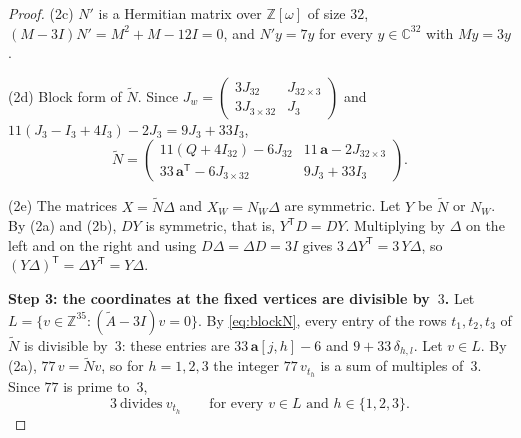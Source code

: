 \documentclass[11pt,a4paper]{article}
\theoremstyle{remark}
\newcommand{\ZZ}{\mathbb{Z}}
\newcommand{\CC}{\mathbb{C}}
\newcommand{\tp}{\mathsf{T}}
\newcommand{\av}{\mathbf{a}}
\newcommand{\tA}{\widetilde{A}}
\newcommand{\tN}{\widetilde{N}}
\newcommand{\Jw}{J_w}
\begin{document}
\begin{proof}
\smallskip\noindent(2c) $N'$ is a Hermitian matrix over $\ZZ[\omega]$ of size $32$, $(M-3I)N'=M^2+M-12I=0$, and
$N'y=7y$ for every $y\in\CC^{32}$ with $My=3y$.

\smallskip\noindent(2d) Block form of $\tN$. Since
$\Jw=\begin{pmatrix}3J_{32}&J_{32\times3}\\ 3J_{3\times32}&J_3\end{pmatrix}$ and
$11(J_3-I_3+4I_3)-2J_3=9J_3+33I_3$,
\begin{equation}\label{eq:blockN}
\tN=\begin{pmatrix}11(Q+4I_{32})-6J_{32}&11\,\av-2J_{32\times3}\\[2pt]
33\,\av^{\tp}-6J_{3\times32}&9J_3+33I_3\end{pmatrix}.
\end{equation}

\smallskip\noindent(2e) The matrices $X=\tN\Delta$ and $X_W=N_W\Delta$ are symmetric. Let $Y$ be $\tN$ or $N_W$. By
(2a) and (2b), $DY$ is symmetric, that is, $Y^{\tp}D=DY$. Multiplying by $\Delta$ on the left and on the right and
using $D\Delta=\Delta D=3I$ gives $3\,\Delta Y^{\tp}=3\,Y\Delta$, so $(Y\Delta)^{\tp}=\Delta Y^{\tp}=Y\Delta$.

\medskip\noindent\textbf{Step 3: the coordinates at the fixed vertices are divisible by~$3$.}
Let $L=\{v\in\ZZ^{35}:(\tA-3I)v=0\}$. By \eqref{eq:blockN}, every entry of the rows $t_1,t_2,t_3$ of $\tN$ is
divisible by~$3$: these entries are $33\,\av[j,h]-6$ and $9+33\,\delta_{h,l}$. Let $v\in L$. By (2a), $77\,v=\tN v$,
so for $h=1,2,3$ the integer $77\,v_{t_h}$ is a sum of multiples of~$3$. Since $77$ is prime to~$3$,
\begin{equation}\label{eq:div3}
3\ \text{divides}\ v_{t_h}\qquad\text{for every }v\in L\text{ and }h\in\{1,2,3\}.
\end{equation}


\end{proof}
\end{document}
